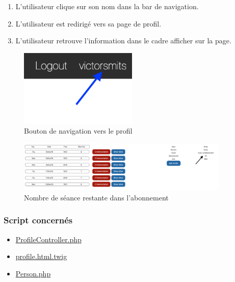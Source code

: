 \begin{enumerate}
	\item L'utilisateur clique sur son nom dans la bar de navigation.
	\item L'utilisateur est redirigé vers sa page de profil. 
	\item L'utilisateur retrouve l'information dans le cadre afficher sur la page.
\end{enumerate}

\vspace{\baselineskip}
\begin{figure}[h]
	\includegraphics[width=0.5\textwidth,center]{Figures/us7-1}
	\caption{Bouton de navigation vers le profil}
\end{figure}

\vspace{\baselineskip}
\begin{figure}[h]
	\includegraphics[width=0.9\textwidth,center]{Figures/us7-2}
	\caption{Nombre de séance restante dans l'abonnement}
\end{figure}


\vspace{\baselineskip}
\subsubsection{Script concernés}
	\begin{itemize}
		\item \href{https://github.com/victorsmits/Aquabike/blob/master/backend/src/Controller/ProfileController.php}{ProfileController.php}
		\item \href{https://github.com/victorsmits/Aquabike/blob/master/backend/templates/registration/profile.html.twig}{profile.html.twig}
		\item \href{https://github.com/victorsmits/Aquabike/blob/master/backend/src/Entity/Person.php}{Person.php}
	\end{itemize}
